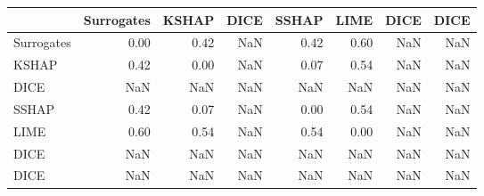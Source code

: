 \begin{tabular}{lrrrrrrr}
\toprule
{} &  Surrogates &  KSHAP &  DICE &  SSHAP &  LIME &  DICE &  DICE \\
\midrule
Surrogates &        0.00 &   0.42 &   NaN &   0.42 &  0.60 &   NaN &   NaN \\
KSHAP      &        0.42 &   0.00 &   NaN &   0.07 &  0.54 &   NaN &   NaN \\
DICE       &         NaN &    NaN &   NaN &    NaN &   NaN &   NaN &   NaN \\
SSHAP      &        0.42 &   0.07 &   NaN &   0.00 &  0.54 &   NaN &   NaN \\
LIME       &        0.60 &   0.54 &   NaN &   0.54 &  0.00 &   NaN &   NaN \\
DICE       &         NaN &    NaN &   NaN &    NaN &   NaN &   NaN &   NaN \\
DICE       &         NaN &    NaN &   NaN &    NaN &   NaN &   NaN &   NaN \\
\bottomrule
\end{tabular}
